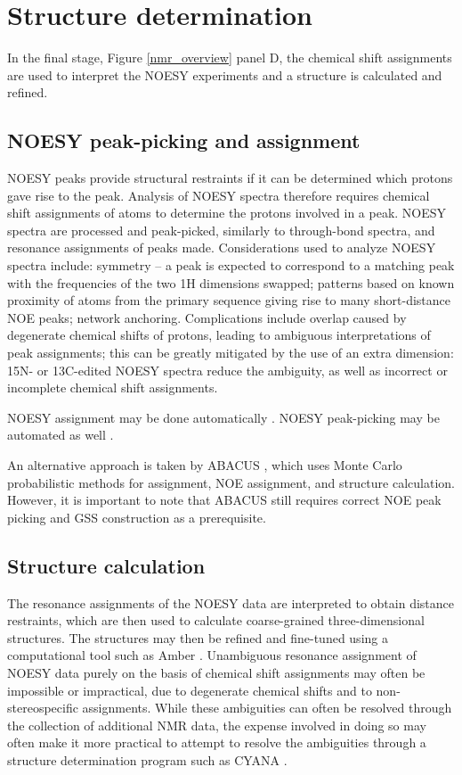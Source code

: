\section{Structure determination}

In the final stage, Figure \ref{nmr_overview} panel D, the chemical shift 
assignments are used to interpret the NOESY experiments and a structure
is calculated and refined.

\subsection{NOESY peak-picking and assignment}
NOESY peaks provide structural restraints if it can be 
determined which protons gave rise to the peak.  Analysis of NOESY spectra 
therefore requires chemical shift assignments of atoms to 
determine the protons involved in a peak.  
NOESY spectra are  processed and peak-picked, similarly to through-bond 
spectra, and resonance assignments of peaks made.  
Considerations used to analyze 
NOESY spectra include: symmetry -- a peak is expected to correspond to a 
matching peak with the frequencies of the two 1H dimensions swapped; patterns 
based on known proximity of atoms from the primary sequence giving rise to 
many short-distance NOE peaks; network anchoring.  Complications include 
overlap caused by degenerate chemical shifts of protons, leading to 
ambiguous interpretations of peak assignments; this can be greatly mitigated 
by the use of an extra dimension:  15N- or 13C-edited NOESY spectra reduce 
the ambiguity, as well as incorrect or incomplete chemical shift assignments.

NOESY assignment may be done automatically \cite{cyana2004, aria2003}.  
NOESY peak-picking may be automated as well \cite{munin, korzhnev2001munin}.

An alternative approach is taken by ABACUS \cite{abacus_assignment}, which uses
Monte Carlo probabilistic methods for assignment, NOE assignment, and structure
calculation.  However, it is important to note that ABACUS still requires 
correct NOE peak picking and GSS construction as a prerequisite.

\subsection{Structure calculation}
The resonance assignments of the NOESY data are 
interpreted to obtain distance restraints, which are then used to calculate 
coarse-grained three-dimensional structures.  The structures may then be 
refined and fine-tuned using a computational tool such as Amber \cite{amber}.  
Unambiguous resonance assignment of NOESY data purely on the basis of chemical 
shift assignments may often be impossible or impractical, due to degenerate 
chemical shifts and to non-stereospecific assignments.  While these 
ambiguities can often be resolved through the collection of additional 
NMR data, the expense involved in doing so may often make it more practical 
to attempt to resolve the ambiguities through a structure determination 
program such as CYANA \cite{cyana2004}.

